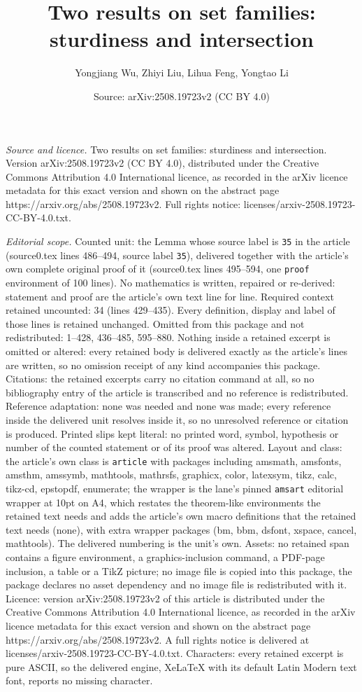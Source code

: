 \documentclass[10pt,a4paper]{amsart}
\title[Two results on set families: sturdiness and intersection]{Two results on set families: sturdiness and intersection}
\author{Yongjiang Wu, Zhiyi Liu, Lihua Feng, Yongtao Li}
\date{Source: arXiv:2508.19723v2 (CC BY 4.0)}
\begin{document}
\maketitle

\noindent\emph{Source and licence.} Two results on set families: sturdiness and intersection. Version arXiv:2508.19723v2 (CC BY 4.0), distributed under the Creative Commons Attribution 4.0 International licence, as recorded in the arXiv licence metadata for this exact version and shown on the abstract page https://arxiv.org/abs/2508.19723v2. Full rights notice: licenses/arxiv-2508.19723-CC-BY-4.0.txt.\par\smallskip

\noindent\textit{Editorial scope.} Counted unit: the Lemma whose source label is \texttt{35} in the article (source0.tex lines 486--494, source label \texttt{35}), delivered together with the article's own complete original proof of it (source0.tex lines 495--594, one \texttt{proof} environment of 100 lines). No mathematics is written, repaired or re-derived: statement and proof are the article's own text line for line. Required context retained uncounted: 34 (lines 429--435). Every definition, display and label of those lines is retained unchanged. Omitted from this package and not redistributed: 1--428, 436--485, 595--880. Nothing inside a retained excerpt is omitted or altered: every retained body is delivered exactly as the article's lines are written, so no omission receipt of any kind accompanies this package. Citations: the retained excerpts carry no citation command at all, so no bibliography entry of the article is transcribed and no reference is redistributed. Reference adaptation: none was needed and none was made; every reference inside the delivered unit resolves inside it, so no unresolved reference or citation is produced. Printed slips kept literal: no printed word, symbol, hypothesis or number of the counted statement or of its proof was altered. Layout and class: the article's own class is \texttt{article} with packages including amsmath, amsfonts, amsthm, amssymb, mathtools, mathrsfs, graphicx, color, latexsym, tikz, calc, tikz-cd, epstopdf, enumerate; the wrapper is the lane's pinned \texttt{amsart} editorial wrapper at 10pt on A4, which restates the theorem-like environments the retained text needs and adds the article's own macro definitions that the retained text needs (none), with extra wrapper packages (bm, bbm, dsfont, xspace, cancel, mathtools). The delivered numbering is the unit's own. Assets: no retained span contains a figure environment, a graphics-inclusion command, a PDF-page inclusion, a table or a TikZ picture; no image file is copied into this package, the package declares no asset dependency and no image file is redistributed with it. Licence: version arXiv:2508.19723v2 of this article is distributed under the Creative Commons Attribution 4.0 International licence, as recorded in the arXiv licence metadata for this exact version and shown on the abstract page https://arxiv.org/abs/2508.19723v2. A full rights notice is delivered at licenses/arxiv-2508.19723-CC-BY-4.0.txt. Characters: every retained excerpt is pure ASCII, so the delivered engine, XeLaTeX with its default Latin Modern text font, reports no missing character.
\end{document}
